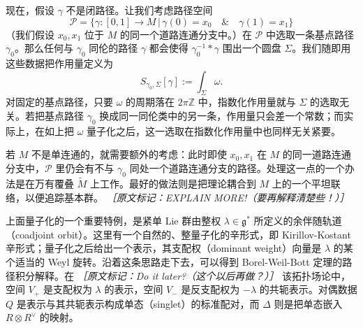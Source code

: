 现在，假设 $\gamma$ 不是闭路径。让我们考虑路径空间
\begin{equation}
  \mathcal{P}=\{\gamma:[0,1]\to M\,|\,\gamma(0)=x_0\quad\&\quad\gamma(1)=x_1\}
  \tag{5.36}
  \label{eq:5.36}
\end{equation}
（我们假设 $x_0,x_1$ 位于 $M$ 的同一个道路连通分支中。）在 $\mathcal{P}$ 中选取一条基点路径 $\gamma_0$。那么任何与 $\gamma_0$ 同伦的路径 $\gamma$ 都会使得 $\gamma_0^{-1}*\gamma$ 围出一个圆盘 $\Sigma$。我们随即用这些数据把作用量定义为
\begin{equation}
  S_{\gamma_0,\Sigma}[\gamma]:=\int_\Sigma \omega.
  \tag{5.37}
  \label{eq:5.37}
\end{equation}
对固定的基点路径，只要 $\omega$ 的周期落在 $2\pi\mathbb{Z}$ 中，指数化作用量就与 $\Sigma$ 的选取无关。若把基点路径 $\gamma_0$ 换成同一同伦类中的另一条，作用量只会差一个常数；而实际上，在如上把 $\omega$ 量子化之后，这一选取在指数化作用量中也同样无关紧要。

若 $M$ 不是单连通的，就需要额外的考虑：此时即使 $x_0,x_1$ 在 $M$ 的同一道路连通分支中，$\mathcal{P}$ 里仍会有不与 $\gamma_0$ 同处一个道路连通分支的路径。处理这一点的一个办法是在万有覆叠 $\widetilde{M}$ 上工作。最好的做法则是把理论耦合到 $M$ 上的一个平坦联络，以便追踪基本群。
{\small\itshape ［原文标记：EXPLAIN MORE!（要再解释清楚些！）］}

上面量子化的一个重要特例，是紧单 Lie 群由整权 $\lambda\in\mathfrak{g}^*$ 所定义的余伴随轨道（coadjoint orbit）。这里有一个自然的、整量子化的辛形式，即 Kirillov-Kostant 辛形式；量子化之后给出一个表示，其支配权（dominant weight）向量是 $\lambda$ 的某个适当的 Weyl 旋转。沿着这条思路走下去，可以得到 Borel-Weil-Bott 定理的路径积分解释。在
{\small\itshape ［原文标记：Do it later?（这个以后再做？）］}
该拓扑场论中，空间 $V_+$ 是支配权为 $\lambda$ 的表示，空间 $V_-$ 是反支配权为 $-\lambda$ 的共轭表示。对偶数据 $Q$ 是表示与其共轭表示构成单态（singlet）的标准配对，而 $\Delta$ 则是把单态嵌入 $R\otimes R^\vee$ 的映射。


